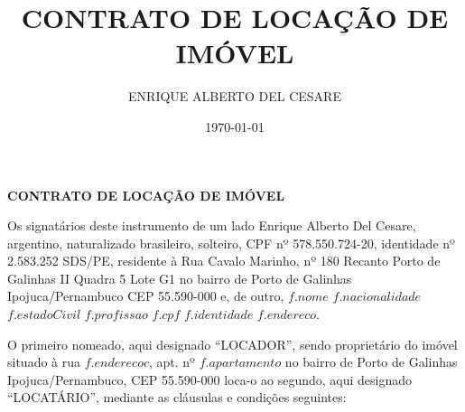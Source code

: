 \documentclass[a4paper,12pt]{article}
\date{\today}
\author{ENRIQUE ALBERTO DEL CESARE}
\title{CONTRATO DE LOCAÇÃO DE IMÓVEL}
\begin{document}
\thispagestyle{empty}
\begin{center}{\bf \huge CONTRATO DE LOCAÇÃO DE IMÓVEL}\\[5.1cm] \end{center}
\newcommand\n{\newcommand}


Os signatários deste  instrumento de um lado Enrique Alberto Del Cesare,
argentino, naturalizado brasileiro, solteiro, CPF nº 578.550.724-20, identidade nº 2.583.252 SDS\//PE,
residente à Rua Cavalo Marinho, nº 180 Recanto Porto de Galinhas II Quadra 5 Lote G1
no bairro de Porto de Galinhas Ipojuca/Pernambuco CEP 55.590-000 e, de outro,
${f.nome}$
${f.nacionalidade}$
${f.estadoCivil}$
${f.profissao}$
${f.cpf}$
${f.identidade}$
${f.endereco}$.

O primeiro nomeado, aqui designado “LOCADOR”, sendo proprietário do imóvel situado à rua ${f.enderecoc}$, apt. nº ${f.apartamento}$ 
no bairro de Porto de Galinhas Ipojuca\//Pernambuco, CEP 55.590-000 loca-o ao segundo, aqui designado “LOCATÁRIO”, mediante as cláusulas e condições seguintes:
\end{document}

